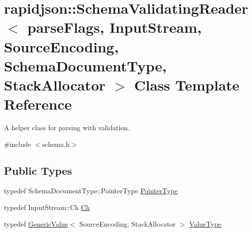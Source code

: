 \hypertarget{classrapidjson_1_1_schema_validating_reader}{}\section{rapidjson\+::Schema\+Validating\+Reader$<$ parse\+Flags, Input\+Stream, Source\+Encoding, Schema\+Document\+Type, Stack\+Allocator $>$ Class Template Reference}
\label{classrapidjson_1_1_schema_validating_reader}


A helper class for parsing with validation.  




{\ttfamily \#include $<$schema.\+h$>$}

\subsection*{Public Types}
\begin{DoxyCompactItemize}
\item 
typedef Schema\+Document\+Type\+::\+Pointer\+Type \mbox{\hyperlink{classrapidjson_1_1_schema_validating_reader_a42c64d1ed25ffb2e70a35b9e43e0e564}{Pointer\+Type}}
\item 
typedef Input\+Stream\+::\+Ch \mbox{\hyperlink{classrapidjson_1_1_schema_validating_reader_a3507a4886ce6778fe1cae39ed5f0baaf}{Ch}}
\item 
typedef \mbox{\hyperlink{classrapidjson_1_1_generic_value}{Generic\+Value}}$<$ Source\+Encoding, Stack\+Allocator $>$ \mbox{\hyperlink{classrapidjson_1_1_schema_validating_reader_a6fb634fa68daaa8c185136258042f4c6}{Value\+Type}}
\end{DoxyCompactItemize}
